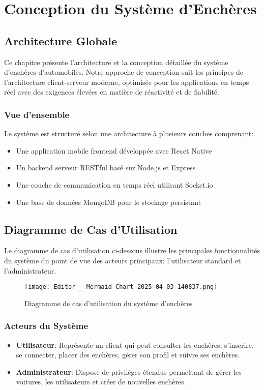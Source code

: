 \chapter{Conception du Système d'Enchères}

\section{Architecture Globale}
Ce chapitre présente l'architecture et la conception détaillée du système d'enchères d'automobiles. Notre approche de conception suit les principes de l'architecture client-serveur moderne, optimisée pour les applications en temps réel avec des exigences élevées en matière de réactivité et de fiabilité.

\subsection{Vue d'ensemble}
Le système est structuré selon une architecture à plusieurs couches comprenant:
\begin{itemize}
    \item Une application mobile frontend développée avec React Native
    \item Un backend serveur RESTful basé sur Node.js et Express
    \item Une couche de communication en temps réel utilisant Socket.io
    \item Une base de données MongoDB pour le stockage persistant
\end{itemize}

\section{Diagramme de Cas d'Utilisation}
Le diagramme de cas d'utilisation ci-dessous illustre les principales fonctionnalités du système du point de vue des acteurs principaux: l'utilisateur standard et l'administrateur.

\begin{figure}[h]
    \centering
    \texttt{[image: Editor \_ Mermaid Chart-2025-04-03-140837.png]}
    \caption{Diagramme de cas d'utilisation du système d'enchères}
    \label{fig:use-case}
\end{figure}

\subsection{Acteurs du Système}
\begin{itemize}
    \item \textbf{Utilisateur}: Représente un client qui peut consulter les enchères, s'inscrire, se connecter, placer des enchères, gérer son profil et suivre ses enchères.
    \item \textbf{Administrateur}: Dispose de privilèges étendus permettant de gérer les voitures, les utilisateurs et créer de nouvelles enchères.
\end{itemize}

